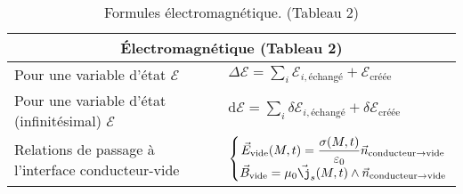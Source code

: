 \documentclass[10pt,a4paper,titlepage,landscape]{article}
\renewcommand{\arraystretch}{2}
\begin{document}
\begin{table}[H]
    \centering
    \renewcommand{\arraystretch}{1.5} %
    \setlength{\tabcolsep}{8pt} %
    \begin{tabular}{@{}|p{9cm}|p{10cm}@{}|}

        \multicolumn{2}{c}{\textbf{Électromagnétique (Tableau 2)}} \\ \hline

    Pour une variable d'état $\mathcal{E}$ & $\displaystyle \Delta \mathcal{E} = \sum\limits_{i} \mathcal{E}_{i, \text{échangé}} + \mathcal{E}_{\text{créée}}$ \\ \hline 
    Pour une variable d'état (infinitésimal) $\mathcal{E}$ & $\displaystyle \text{d} \mathcal{E} = \sum\limits_{i} \delta\mathcal{E}_{i, \text{échangé}} + \delta \mathcal{E}_{\text{créée}}$ \\ \hline 
    Relations de passage à l'interface conducteur-vide & $\left\{\begin{matrix} \vec{E}_{\text{vide}}(M,t) = \dfrac{\sigma(M,t)}{\varepsilon_0}\vec{n}_{\text{conducteur} \to \text{vide}} \\ \vec{B}_{\text{vide}} = \mu_0 \vec{\j}_s(M,t)\wedge \vec{n}_{\text{conducteur} \to \text{vide}}\end{matrix}\right.$ \\ \hline
    \end{tabular}
\caption{Formules électromagnétique. (Tableau 2)}
\label{tab:electromag2}
\end{table}
\end{document}
